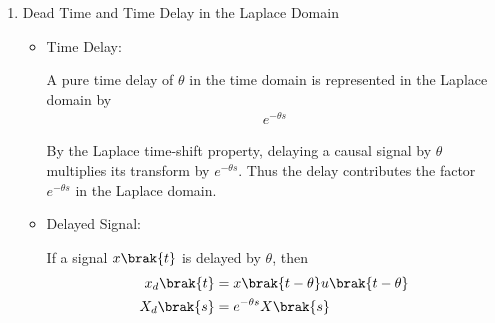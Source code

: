 \begin{enumerate}[label=\thesubsection.\arabic*, ref=\thesubsection.\theenumi,itemsep=0pt]
\begin{itemize}
\solution
Each entry of the Jacobian is the partial derivative of one component of $\vec{F}$ with respect to one variable. Placing all derivatives $\partial F_i/\partial x_j$ in row $i$, column $j$ gives the displayed matrix $J_{\vec{F}}$.
\item Divergence:
\begin{align}
\nabla\cdot\vec{F}
&= \sum_{i=1}^{n}
\frac{\partial F_i}{\partial x_i}
\label{eq:divergence}
\end{align}


\solution
Divergence measures the net local outflow of a vector field. It is defined as the sum of the partial derivative of each component with respect to its corresponding coordinate:
\begin{align}
\nabla\cdot\vec{F}
&=\frac{\partial F_1}{\partial x_1}+\cdots+\frac{\partial F_n}{\partial x_n}
=\sum_{i=1}^{n}\frac{\partial F_i}{\partial x_i}.
\end{align}
\item Relation Between Jacobian and Divergence:
\begin{align}
\nabla\cdot\vec{F}
&= \operatorname{tr}\brak{J_{\vec{F}}}
\label{eq:divergence_trace}
\end{align}


\solution
The trace of a matrix is the sum of its diagonal entries. The diagonal entries of $J_{\vec{F}}$ are $\partial F_i/\partial x_i$, so
\begin{align}
\operatorname{tr}(J_{\vec{F}})
&=\sum_{i=1}^{n}\frac{\partial F_i}{\partial x_i}
=\nabla\cdot\vec{F}.
\end{align}
\end{itemize}

\item Dead Time and Time Delay in the Laplace Domain
\begin{itemize}

\item Time Delay:

A pure time delay of $\theta$ in the time domain is represented in the Laplace domain by
\begin{align}
e^{-\theta s}
\end{align}


\solution
By the Laplace time-shift property, delaying a causal signal by $\theta$ multiplies its transform by $e^{-\theta s}$. Thus the delay contributes the factor $e^{-\theta s}$ in the Laplace domain.
\item Delayed Signal:

If a signal $x\brak{t}$ is delayed by $\theta$, then
\begin{align}
x_d\brak{t}
&= x\brak{t-\theta}u\brak{t-\theta}\\
X_d\brak{s}
&= e^{-\theta s}X\brak{s}
\end{align}



\end{itemize}
\end{enumerate}

